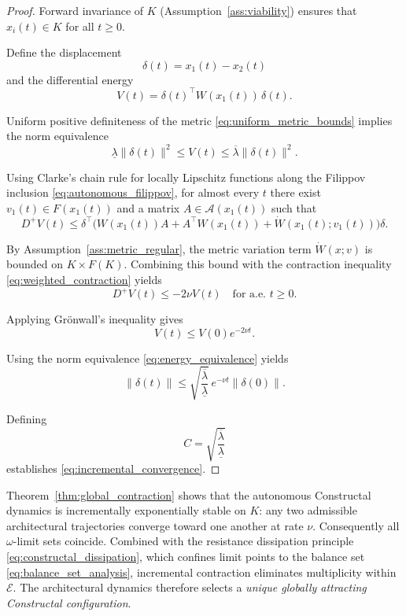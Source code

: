 \documentclass[12pt]{article}
\theoremstyle{plain}
\theoremstyle{definition}
\theoremstyle{remark}
\begin{document}
\begin{proof}

Forward invariance of $K$ (Assumption~\ref{ass:viability})
ensures that $x_i(t)\in K$ for all $t\ge0$.

Define the displacement
\[
\delta(t)=x_1(t)-x_2(t)
\]
and the differential energy
\begin{equation}
V(t)
=
\delta(t)^\top W(x_1(t))\,\delta(t).
\label{eq:V_definition}
\end{equation}

Uniform positive definiteness of the metric
\eqref{eq:uniform_metric_bounds}
implies the norm equivalence
\begin{equation}
\underline{\lambda}\|\delta(t)\|^2
\le
V(t)
\le
\overline{\lambda}\|\delta(t)\|^2 .
\label{eq:energy_equivalence}
\end{equation}

Using Clarke’s chain rule for locally Lipschitz functions along the
Filippov inclusion \eqref{eq:autonomous_filippov},
for almost every $t$ there exist
$v_1(t)\in F(x_1(t))$
and a matrix
$A\in\mathcal A(x_1(t))$
such that
\begin{equation}
D^+V(t)
\le
\delta^\top
\Big(
W(x_1(t))A
+
A^\top W(x_1(t))
+
\dot W(x_1(t);v_1(t))
\Big)
\delta .
\label{eq:V_derivative}
\end{equation}

By Assumption~\ref{ass:metric_regular},
the metric variation term $\dot W(x;v)$ is bounded on
$K\times F(K)$.
Combining this bound with the contraction inequality
\eqref{eq:weighted_contraction}
yields
\begin{equation}
D^+V(t)\le -2\nu V(t)
\quad \text{for a.e. } t\ge0 .
\label{eq:Dini_decay}
\end{equation}

Applying Grönwall’s inequality gives
\begin{equation}
V(t)\le V(0)e^{-2\nu t}.
\label{eq:V_decay}
\end{equation}

Using the norm equivalence \eqref{eq:energy_equivalence} yields
\[
\|\delta(t)\|
\le
\sqrt{\frac{\overline{\lambda}}{\underline{\lambda}}}
\,e^{-\nu t}
\|\delta(0)\|.
\]

Defining
\[
C=\sqrt{\frac{\overline{\lambda}}{\underline{\lambda}}}
\]
establishes \eqref{eq:incremental_convergence}.
\end{proof}

\medskip

Theorem~\ref{thm:global_contraction} shows that the autonomous
Constructal dynamics is incrementally exponentially stable on $K$:
any two admissible architectural trajectories converge toward one
another at rate $\nu$.
Consequently all $\omega$-limit sets coincide. Combined with the resistance dissipation principle
\eqref{eq:constructal_dissipation},
which confines limit points to the balance set
\eqref{eq:balance_set_analysis},
incremental contraction eliminates multiplicity within
$\mathcal E$.
The architectural dynamics therefore selects a
\emph{unique globally attracting Constructal configuration}.
\end{document}
